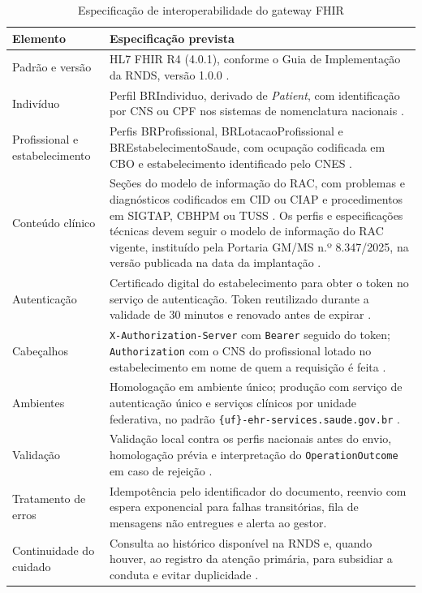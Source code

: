 \begin{table}[H]
\centering
\caption{Especificação de interoperabilidade do gateway FHIR}
\label{tab:interop}
\footnotesize
\begin{tabularx}{\textwidth}{L{3.1cm} Y}
\toprule
\textbf{Elemento} & \textbf{Especificação prevista} \\
\midrule
Padrão e versão & HL7 FHIR R4 (4.0.1), conforme o Guia de Implementação da RNDS, versão 1.0.0 \cite{rndsig, hl7fhirr4}. \\
Indivíduo & Perfil BRIndividuo, derivado de \textit{Patient}, com identificação por CNS ou CPF nos sistemas de nomenclatura nacionais \cite{rndsig}. \\
Profissional e estabelecimento & Perfis BRProfissional, BRLotacaoProfissional e BREstabelecimentoSaude, com ocupação codificada em CBO e estabelecimento identificado pelo CNES \cite{rndsig}. \\
Conteúdo clínico & Seções do modelo de informação do RAC, com problemas e diagnósticos codificados em CID ou CIAP e procedimentos em SIGTAP, CBHPM ou TUSS \cite{portaria234}. Os perfis e especificações técnicas devem seguir o modelo de informação do RAC vigente, instituído pela Portaria GM/MS n.º 8.347/2025, na versão publicada na data da implantação \cite{portaria8347}. \\
Autenticação & Certificado digital do estabelecimento para obter o token no serviço de autenticação. Token reutilizado durante a validade de 30 minutos e renovado antes de expirar \cite{rndsconector}. \\
Cabeçalhos & \texttt{X-Authorization-Server} com \texttt{Bearer} seguido do token; \texttt{Authorization} com o CNS do profissional lotado no estabelecimento em nome de quem a requisição é feita \cite{rndsconector, rndserros}. \\
Ambientes & Homologação em ambiente único; produção com serviço de autenticação único e serviços clínicos por unidade federativa, no padrão \texttt{\{uf\}-ehr-services.saude.gov.br} \cite{rndsambientes}. \\
Validação & Validação local contra os perfis nacionais antes do envio, homologação prévia e interpretação do \texttt{OperationOutcome} em caso de rejeição \cite{rndserros}. \\
Tratamento de erros & Idempotência pelo identificador do documento, reenvio com espera exponencial para falhas transitórias, fila de mensagens não entregues e alerta ao gestor. \\
Continuidade do cuidado & Consulta ao histórico disponível na RNDS e, quando houver, ao registro da atenção primária, para subsidiar a conduta e evitar duplicidade \cite{celuppi2024, neto2021}. \\
\bottomrule
\end{tabularx}
\end{table}


